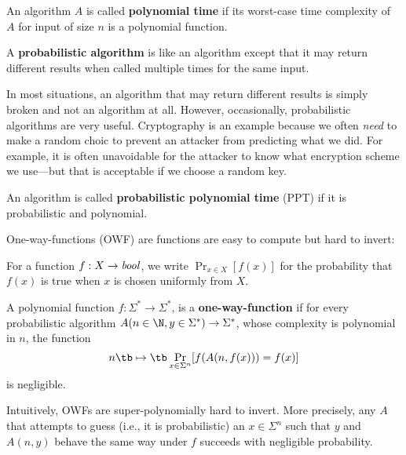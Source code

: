 \begin{definition}
 An algorithm $A$ is called \textbf{polynomial time} if its worst-case time complexity of $A$ for input of size $n$ is a polynomial function.
\end{definition}

\begin{definition}
 A \textbf{probabilistic algorithm} is like an algorithm except that it may return different results when called multiple times for the same input.
\end{definition}

In most situations, an algorithm that may return different results is simply broken and not an algorithm at all.
However, occasionally, probabilistic algorithms are very useful.
Cryptography is an example because we often \emph{need} to make a random choic to prevent an attacker from predicting what we did.
For example, it is often unavoidable for the attacker to know what encryption scheme we use---but that is acceptable if we choose a random key.

\begin{definition}
 An algorithm is called \textbf{probabilistic polynomial time} (PPT) if it is probabilistic and polynomial.
\end{definition}

One-way-functions (OWF) are functions are easy to compute but hard to invert:

\newcommand{\Prob}[2]{\mathop{\mathrm{Pr}}_{#1}[#2]}

\begin{notation}
For a function $f:X\to\mathit{bool}$, we write $\Prob{x\in X}{f(x)}$ for the probability that $f(x)$ is true when $x$ is chosen uniformly from $X$.
\end{notation}

\begin{definition}
 A polynomial function $f:\Sigma^*\to \Sigma^*$, is a \textbf{one-way-function} if for every probabilistic algorithm $A(n\in\N,y\in \Sigma^*)\to\Sigma^*$, whose complexity is polynomial in $n$, the function
 \[n\tb\mapsto\tb \Prob{x\in\Sigma^n}{f(A(n,f(x)))=f(x)}\]
 is negligible.
\end{definition}
Intuitively, OWFs are super-polynomially hard to invert.
More precisely, any $A$ that attempts to guess (i.e., it is probabilistic) an $x\in\Sigma^n$ such that $y$ and $A(n,y)$ behave the same way under $f$ succeeds with negligible probability.

